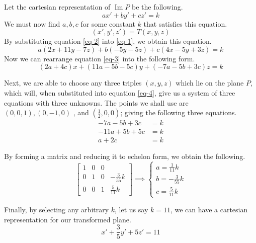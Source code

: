 \documentclass{article}
\newenvironment{answers}{ %
	\begin{enumerate}
		\setlength{\itemsep}{\bigskipamount}
}{\end{enumerate}}
\newcommand{\img}{\operatorname{Im}}
\begin{document}
\begin{answers}
\begin{enumerate}
				Let the cartesian representation of \(\img P\) be the following.
				\begin{equation}
					ax'+by'+cz'=k \label{eq-1}
				\end{equation}
				We must now find \(a, b, c\) for some constant \(k\) that satisfies this equation.
				\begin{equation}
					(x', y', z') = T(x,y,z) \label{eq-2}
				\end{equation}
				By substituting equation \ref{eq-2} into \ref{eq-1}, we obtain this equation.
				\begin{equation}
					a(2x + 11y - 7z)+b(-5y - 5z)+c(4x - 5y + 3z)=k \label{eq-3}
				\end{equation}
				Now we can rearrange equation \ref{eq-3} into the following form.
				\begin{equation}
					(2a+4c)x+(11a-5b-5c)y+(-7a-5b+3c)z=k \label{eq-4}
				\end{equation}

				Next, we are able to choose any three triples \((x, y, z)\) which lie on the plane \(P\), which will, when substituted into equation \ref{eq-4}, give us a system of three equations with three unknowns. The points we shall use are \((0,0,1), (0, -1, 0)\) , and \((\frac{1}{2}, 0, 0)\); giving the following three equations.
				\begin{align*}
					-7a-5b+3c  & =k \\
					-11a+5b+5c & =k \\
					a+2c       & =k
				\end{align*}

				By forming a matrix and reducing it to echelon form, we obtain the following.
				\begin{equation*}
					\left[ \begin{matrix}
							1 & 0 & 0 &                \\[6pt]
							0 & 1 & 0 & -\frac{3}{55}k \\[6pt]
							0 & 0 & 1 & \frac{5}{11}k
						\end{matrix} \right]
					\implies
					\begin{cases}
						a= \frac{1}{11} k \\
						b= -\frac{3}{55}k \\
						c= \frac{5}{11}k
					\end{cases}
				\end{equation*}

				Finally, by selecting any arbitrary \(k\), let us say \(k=11\), we can have a cartesian representation for our transformed plane.
				\begin{equation*}
					x'+\frac{3}{5}y'+5z'=11
				\end{equation*}
		\end{enumerate}
\end{answers}
\end{document}
